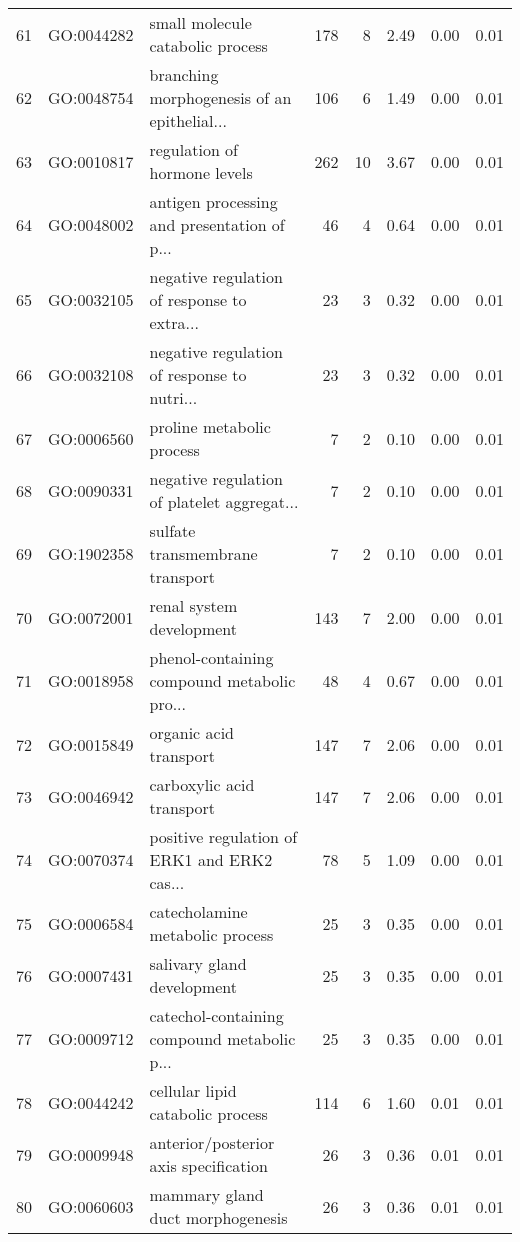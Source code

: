 \begin{table}[ht]
\begin{tabular}{rllrrrrr}
  61 & GO:0044282 & small molecule catabolic process & 178 &   8 & 2.49 & 0.00 & 0.01 \\ 
  62 & GO:0048754 & branching morphogenesis of an epithelial... & 106 &   6 & 1.49 & 0.00 & 0.01 \\ 
  63 & GO:0010817 & regulation of hormone levels & 262 &  10 & 3.67 & 0.00 & 0.01 \\ 
  64 & GO:0048002 & antigen processing and presentation of p... &  46 &   4 & 0.64 & 0.00 & 0.01 \\ 
  65 & GO:0032105 & negative regulation of response to extra... &  23 &   3 & 0.32 & 0.00 & 0.01 \\ 
  66 & GO:0032108 & negative regulation of response to nutri... &  23 &   3 & 0.32 & 0.00 & 0.01 \\ 
  67 & GO:0006560 & proline metabolic process &   7 &   2 & 0.10 & 0.00 & 0.01 \\ 
  68 & GO:0090331 & negative regulation of platelet aggregat... &   7 &   2 & 0.10 & 0.00 & 0.01 \\ 
  69 & GO:1902358 & sulfate transmembrane transport &   7 &   2 & 0.10 & 0.00 & 0.01 \\ 
  70 & GO:0072001 & renal system development & 143 &   7 & 2.00 & 0.00 & 0.01 \\ 
  71 & GO:0018958 & phenol-containing compound metabolic pro... &  48 &   4 & 0.67 & 0.00 & 0.01 \\ 
  72 & GO:0015849 & organic acid transport & 147 &   7 & 2.06 & 0.00 & 0.01 \\ 
  73 & GO:0046942 & carboxylic acid transport & 147 &   7 & 2.06 & 0.00 & 0.01 \\ 
  74 & GO:0070374 & positive regulation of ERK1 and ERK2 cas... &  78 &   5 & 1.09 & 0.00 & 0.01 \\ 
  75 & GO:0006584 & catecholamine metabolic process &  25 &   3 & 0.35 & 0.00 & 0.01 \\ 
  76 & GO:0007431 & salivary gland development &  25 &   3 & 0.35 & 0.00 & 0.01 \\ 
  77 & GO:0009712 & catechol-containing compound metabolic p... &  25 &   3 & 0.35 & 0.00 & 0.01 \\ 
  78 & GO:0044242 & cellular lipid catabolic process & 114 &   6 & 1.60 & 0.01 & 0.01 \\ 
  79 & GO:0009948 & anterior/posterior axis specification &  26 &   3 & 0.36 & 0.01 & 0.01 \\ 
  80 & GO:0060603 & mammary gland duct morphogenesis &  26 &   3 & 0.36 & 0.01 & 0.01 \\ 

\end{tabular}
\end{table}

